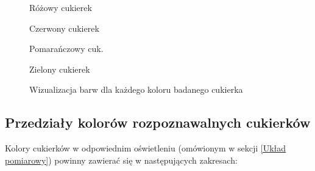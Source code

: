 \documentclass{article}
\begin{document}
\begin{figure}[H]
    \centering
    \begin{tcolorbox}[colback=white]

    \begin{multicols}{4}
    Różowy cukierek
    \begin{tcolorbox}[colback=my-pink-dark, width=\linewidth, colframe=my-pink-dark]
    \end{tcolorbox}
    Czerwony cukierek
    \begin{tcolorbox}[colback=my-red-dark, width=\linewidth, colframe=my-red-dark]
    \end{tcolorbox}
    Pomarańczowy cuk.
    \begin{tcolorbox}[colback=my-orange-dark, width=\linewidth, colframe=my-orange-dark]
    \end{tcolorbox}
    Zielony cukierek
    \begin{tcolorbox}[colback=my-green, width=\linewidth, colframe=my-green]
    \end{tcolorbox}
    \end{multicols}

    \begin{multicols}{4}
    \begin{tcolorbox}[colback=my-pink-light, width=\linewidth, colframe=my-pink-light]
    \end{tcolorbox}
    \begin{tcolorbox}[colback=my-red-light, width=\linewidth, colframe=my-red-light]
    \end{tcolorbox}
    \begin{tcolorbox}[colback=my-orange-light, width=\linewidth, colframe=my-orange-light]
    \end{tcolorbox}
    \end{multicols}

    \end{tcolorbox}
    \caption{Wizualizacja barw dla każdego koloru badanego cukierka}
\end{figure}






\subsection{Przedziały kolorów rozpoznawalnych cukierków}

Kolory cukierków w odpowiednim oświetleniu (omówionym w sekcji \ref{Układ pomiarowy}) powinny zawierać się w następujących zakresach:
\end{document}
